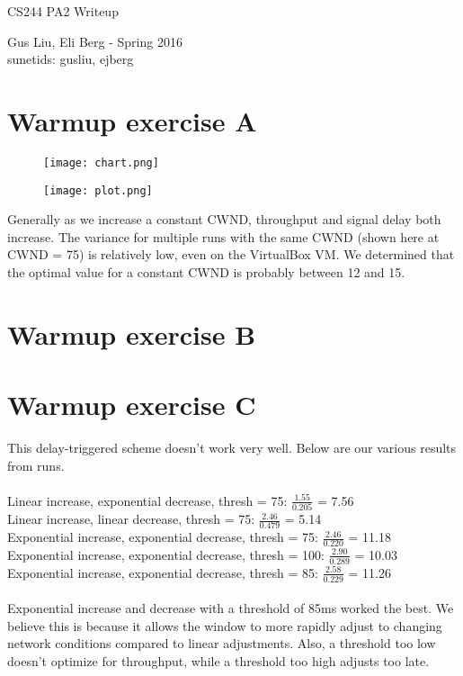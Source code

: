 \documentclass[12pt]{article}
\begin{document}
\begin{center}
{\Large CS244 PA2 Writeup}
\begin{center}
Gus Liu, Eli Berg - Spring 2016 \\
sunetids: gusliu, ejberg
\end{center} 
\end{center}

\section*{Warmup exercise A}

\begin{figure}[h!]
  \texttt{[image: chart.png]}
\end{figure}
\begin{figure}[h!]
  \texttt{[image: plot.png]}
\end{figure}

Generally as we increase a constant CWND, throughput and signal delay both increase. The variance for multiple runs with the same CWND (shown here at CWND = 75) is relatively low, even on the VirtualBox VM. We determined that the optimal value for a constant CWND is probably between 12 and 15.
	
	
	\pagebreak[4]
\section*{Warmup exercise B}
	
	
\section*{Warmup exercise C}
	This delay-triggered scheme doesn't work very well. Below are our various results from runs.
\\
\\
Linear increase, exponential decrease, thresh = 75: $\frac{1.55}{0.205}$ = 7.56 \\
Linear increase, linear decrease, thresh =  75: $\frac{2.46}{0.479}$ = 5.14 \\
Exponential increase, exponential decrease, thresh =  75: $\frac{2.46}{0.220}$ = 11.18 \\
Exponential increase, exponential decrease, thresh =  100: $\frac{2.90}{0.289}$ = 10.03 \\
Exponential increase, exponential decrease, thresh =  85: $\frac{2.58}{0.229}$ = 11.26 \\
\\
Exponential increase and decrease with a threshold of 85ms worked the best. We believe this is because it allows the window to more rapidly adjust to changing network conditions compared to linear adjustments. Also, a threshold too low doesn't optimize for throughput, while a threshold too high adjusts too late. 
\end{document}
